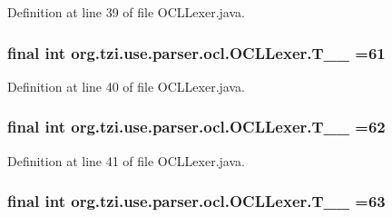 Definition at line 39 of file O\-C\-L\-Lexer.\-java.

\hypertarget{classorg_1_1tzi_1_1use_1_1parser_1_1ocl_1_1_o_c_l_lexer_a0895e872f8be857f2b203b52d6f45b09}{
\subsubsection[{T\-\_\-\-\_\-61}]{\setlength{\rightskip}{0pt plus 5cm}final int org.\-tzi.\-use.\-parser.\-ocl.\-O\-C\-L\-Lexer.\-T\-\_\-\-\_ =61\hspace{0.3cm}{\ttfamily [static]}}}\label{classorg_1_1tzi_1_1use_1_1parser_1_1ocl_1_1_o_c_l_lexer_a0895e872f8be857f2b203b52d6f45b09}


Definition at line 40 of file O\-C\-L\-Lexer.\-java.

\hypertarget{classorg_1_1tzi_1_1use_1_1parser_1_1ocl_1_1_o_c_l_lexer_a7b4b8d094b6d4c14456207cc48fd0061}{
\subsubsection[{T\-\_\-\-\_\-62}]{\setlength{\rightskip}{0pt plus 5cm}final int org.\-tzi.\-use.\-parser.\-ocl.\-O\-C\-L\-Lexer.\-T\-\_\-\-\_ =62\hspace{0.3cm}{\ttfamily [static]}}}\label{classorg_1_1tzi_1_1use_1_1parser_1_1ocl_1_1_o_c_l_lexer_a7b4b8d094b6d4c14456207cc48fd0061}


Definition at line 41 of file O\-C\-L\-Lexer.\-java.

\hypertarget{classorg_1_1tzi_1_1use_1_1parser_1_1ocl_1_1_o_c_l_lexer_a1b792baf291a9a76f57e079ade644a5d}{
\subsubsection[{T\-\_\-\-\_\-63}]{\setlength{\rightskip}{0pt plus 5cm}final int org.\-tzi.\-use.\-parser.\-ocl.\-O\-C\-L\-Lexer.\-T\-\_\-\-\_ =63\hspace{0.3cm}{\ttfamily [static]}}}\label{classorg_1_1tzi_1_1use_1_1parser_1_1ocl_1_1_o_c_l_lexer_a1b792baf291a9a76f57e079ade644a5d}


